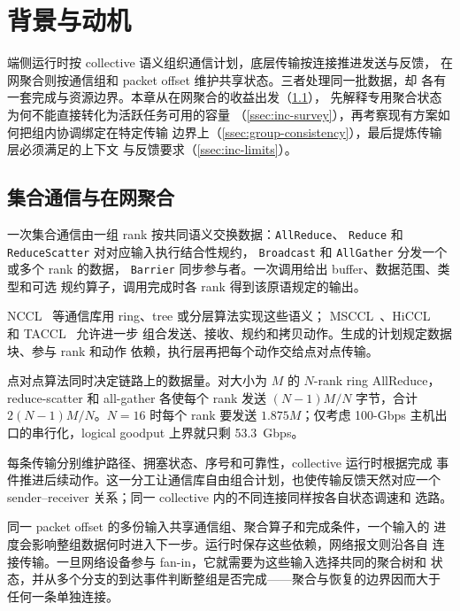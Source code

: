 \chapter{背景与动机}
\label{chap:background}

端侧运行时按 collective 语义组织通信计划，底层传输按连接推进发送与反馈，
在网聚合则按通信组和 packet offset 维护共享状态。三者处理同一批数据，却
各有一套完成与资源边界。本章从在网聚合的收益出发（\cref{ssec:p2p-ccl}），
先解释专用聚合状态为何不能直接转化为活跃任务可用的容量
（\cref{ssec:inc-survey}），再考察现有方案如何把组内协调绑定在特定传输
边界上（\cref{ssec:group-consistency}），最后提炼传输层必须满足的上下文
与反馈要求（\cref{ssec:inc-limits}）。

\section{集合通信与在网聚合}
\label{ssec:p2p-ccl}
\label{ssec:inc-mech}

一次集合通信由一组 rank 按共同语义交换数据：\texttt{AllReduce}、
\texttt{Reduce} 和 \texttt{ReduceScatter} 对对应输入执行结合性规约，
\texttt{Broadcast} 和 \texttt{AllGather} 分发一个或多个 rank 的数据，
\texttt{Barrier} 同步参与者。一次调用给出 buffer、数据范围、类型和可选
规约算子，调用完成时各 rank 得到该原语规定的输出。

NCCL~\cite{nccl} 等通信库用 ring、tree 或分层算法实现这些语义；
MSCCL~\cite{msccl}、HiCCL~\cite{hiccl} 和 TACCL~\cite{taccl} 允许进一步
组合发送、接收、规约和拷贝动作。生成的计划规定数据块、参与 rank 和动作
依赖，执行层再把每个动作交给点对点传输。

点对点算法同时决定链路上的数据量。对大小为 $M$ 的 $N$-rank ring
AllReduce，reduce-scatter 和 all-gather 各使每个 rank 发送 $(N-1)M/N$
字节，合计 $2(N-1)M/N$。$N=16$ 时每个 rank 要发送 $1.875M$；仅考虑
100-Gbps 主机出口的串行化，logical goodput 上界就只剩 53.3~Gbps。

每条传输分别维护路径、拥塞状态、序号和可靠性，collective 运行时根据完成
事件推进后续动作。这一分工让通信库自由组合计划，也使传输反馈天然对应一个
sender--receiver 关系；同一 collective 内的不同连接同样按各自状态调速和
选路。

同一 packet offset 的多份输入共享通信组、聚合算子和完成条件，一个输入的
进度会影响整组数据何时进入下一步。运行时保存这些依赖，网络报文则沿各自
连接传输。一旦网络设备参与 fan-in，它就需要为这些输入选择共同的聚合树和
状态，并从多个分支的到达事件判断整组是否完成——聚合与恢复的边界因而大于
任何一条单独连接。

